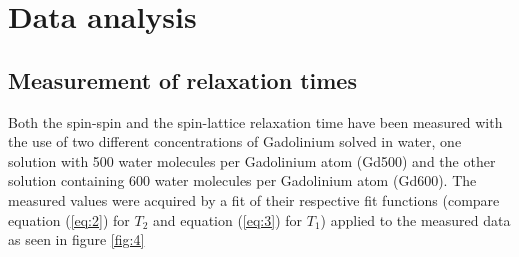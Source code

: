 \section{Data analysis}
\subsection{Measurement of relaxation times}
Both the spin-spin and the spin-lattice relaxation time have been measured with the use of two different concentrations of Gadolinium solved in water, one solution with 500 water molecules per Gadolinium atom (Gd500) and the other solution containing 600 water molecules per Gadolinium atom (Gd600).
The measured values were acquired by a fit of their respective fit functions (compare equation (\ref{eq:2}) for $T_2$ and equation (\ref{eq:3}) for $T_1$) applied to the measured data as seen in figure \ref{fig:4}

